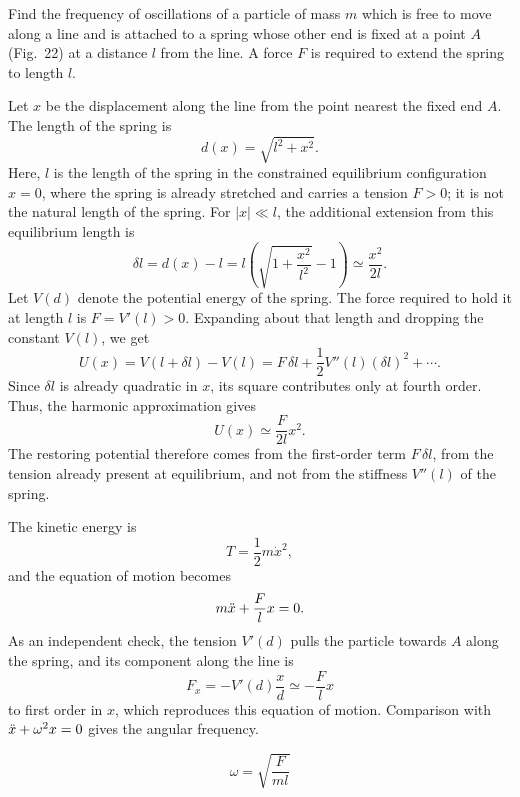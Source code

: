 
\begin{problem}[title={Particle on a line held by a spring}]
{
Find the frequency of oscillations of a particle of mass $m$ which is free to move along a line and is attached to a spring whose other end is fixed at a point $A$ (Fig.~22) at a distance $l$ from the line. A force $F$ is required to extend the spring to length $l$.
}
{
Let $x$ be the displacement along the line from the point nearest the fixed end $A$. The length of the spring is
\begin{equation*}
    d(x) = \sqrt{l^2 + x^2}.
\end{equation*}
Here, $l$ is the length of the spring in the constrained equilibrium configuration $x = 0$, where the spring is already stretched and carries a tension $F > 0$; it is not the natural length of the spring. For $|x| \ll l$, the additional extension from this equilibrium length is
\begin{equation*}
    \delta l = d(x) - l = l\left(\sqrt{1 + \frac{x^2}{l^2}} - 1\right) \simeq \frac{x^2}{2l}.
\end{equation*}
Let $V(d)$ denote the potential energy of the spring. The force required to hold it at length $l$ is $F = V'(l) > 0$. Expanding about that length and dropping the constant $V(l)$, we get
\begin{equation*}
    U(x) = V(l + \delta l) - V(l) = F\,\delta l + \frac{1}{2}V''(l)\left(\delta l\right)^2 + \cdots.
\end{equation*}
Since $\delta l$ is already quadratic in $x$, its square contributes only at fourth order. Thus, the harmonic approximation gives
\begin{equation*}
    U(x) \simeq \frac{F}{2l}x^2.
\end{equation*}
The restoring potential therefore comes from the first-order term $F\,\delta l$, \ie from the tension already present at equilibrium, and not from the stiffness $V''(l)$ of the spring.

The kinetic energy is
\begin{equation*}
    T = \frac{1}{2}m\Dot{x}^2,
\end{equation*}
and the equation of motion becomes
\begin{equation*}
    m\Ddot{x} + \frac{F}{l}x = 0.
\end{equation*}
As an independent check, the tension $V'(d)$ pulls the particle towards $A$ along the spring, and its component along the line is
\begin{equation*}
    F_x = -V'(d)\frac{x}{d} \simeq -\frac{F}{l}x
\end{equation*}
to first order in $x$, which reproduces this equation of motion. Comparison with $\Ddot{x} + \omega^2x = 0$ gives the angular frequency.
}
{
\begin{equation*}
    \omega = \sqrt{\frac{F}{ml}}
\end{equation*}
}
\end{problem}

